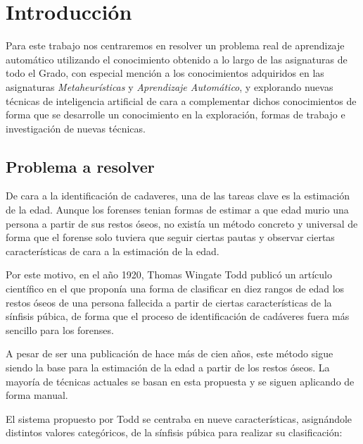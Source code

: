 \section{Introducción}

Para este trabajo nos centraremos en resolver un problema real de aprendizaje automático utilizando el conocimiento obtenido a lo largo de las asignaturas de todo el Grado, con especial mención a los conocimientos adquiridos en las asignaturas \textit{Metaheurísticas} y \textit{Aprendizaje Automático}, y explorando nuevas técnicas de inteligencia artificial de cara a complementar dichos conocimientos de forma que se desarrolle un conocimiento en la exploración, formas de trabajo e investigación de nuevas técnicas.

\subsection{Problema a resolver}

De cara a la identificación de cadaveres, una de las tareas clave es la estimación de la edad. Aunque los forenses tenian formas de estimar a que edad murio una persona a partir de sus restos óseos, no existía un método concreto y universal de forma que el forense solo tuviera que seguir ciertas pautas y observar ciertas características de cara a la estimación de la edad.

Por este motivo, en el año 1920, Thomas Wingate Todd publicó un artículo científico \cite{todd} en el que proponía una forma de clasificar en diez rangos de edad los restos óseos de una persona fallecida a partir de ciertas características de la sínfisis púbica, de forma que el proceso de identificación de cadáveres fuera más sencillo para los forenses.

A pesar de ser una publicación de hace más de cien años, este método sigue siendo la base para la estimación de la edad a partir de los restos óseos. La mayoría de técnicas actuales se basan en esta propuesta y se siguen aplicando de forma manual.

El sistema propuesto por Todd se centraba en nueve características, asignándole distintos valores categóricos, de la sínfisis púbica para realizar su clasificación:

